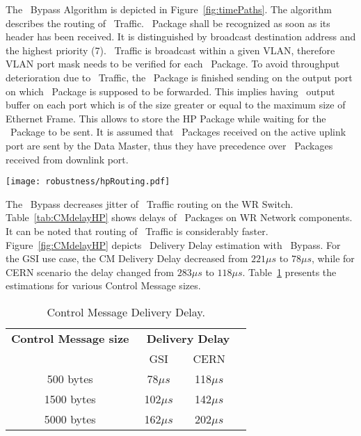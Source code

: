 The \HP\ Bypass Algorithm is depicted in Figure~\ref{fig:timePaths}. The
algorithm describes the routing of \HP\ Traffic. \HP\ Package shall be recognized as
soon as its header has been received. It is distinguished by broadcast
destination address and the highest priority (7). \HP\ Traffic is broadcast
within a given VLAN, therefore VLAN port mask needs to be verified for each \HP\
Package. To avoid throughput deterioration due to \HP\ Traffic, the \SP\ Package
is finished sending on the output port on which \HP\ Package is supposed
to be forwarded. This implies having \HP\ output buffer on each port which is
of the size greater or equal to the maximum size of Ethernet Frame. This allows
to store the HP Package while waiting for the \SP\ Package to be sent. It is assumed
that \HP\ Packages received on the active uplink port are sent by the Data
Master, thus they have precedence over \HP\ Packages received from downlink
port.
 
\begin{center}
	\texttt{[image: robustness/hpRouting.pdf]}
	\label{fig:timePaths}
\end{center}


The \HP\ Bypass decreases jitter of \HP\ Traffic routing
on the WR Switch. Table~\ref{tab:CMdelayHP} shows delays of \HP\ Packages on WR
Network components. It can be noted that routing of \HP\ Traffic is considerably
faster. Figure~\ref{fig:CMdelayHP} depicts \ControlMessage\ Delivery Delay
estimation with \HP\ Bypass. For the GSI use case, the CM Delivery Delay
decreased from $221\mu s$ to $78\mu s$, while for CERN scenario the delay
changed from $283\mu s$ to $118\mu s$. Table~\ref{tab:CMspDelay} presents the
estimations for various Control Message sizes.

\begin{table}[ht]
\caption{Control Message Delivery Delay.} 
\centering
	\begin{tabular}{| c | c | c | c |}          \hline
\textbf{Control Message size}& \multicolumn{2}{|c|}{\textbf{\ControlMessage\
Delivery Delay}}\\
               &    GSI           & CERN          \\ \hline
500 bytes      & 78$\mu s$        & 118$\mu s$    \\ \hline
1500 bytes     & 102$\mu s$       & 142$\mu s$    \\ \hline
5000 bytes     & 162$\mu s$       & 202$\mu s$    \\ \hline
\end{tabular}
\label{tab:CMspDelay}
\end{table}


